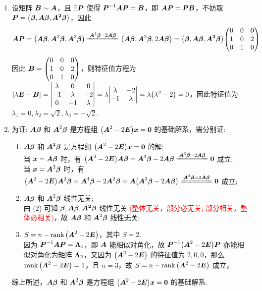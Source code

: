 \begin{solution}
\begin{enumerate}[label=(\arabic{*})]
        \item 设矩阵 $\vb*{B}\sim\vb*{A}$，且 $\exists\vb*{P}$ 使得 $\vb*{P}^{-1}\vb*{AP}=\vb*{B}$，即 $\vb*{AP}=\vb*{PB}$，不妨取 $\vb*{P}=\qty(\vb*{\beta},\vb*{A\beta},\vb*{A^2\beta})$，因此
              $$\vb*{AP}=\qty(\vb*{A\beta},\vb*{A}^2\vb*{\beta},\vb*{A}^3\vb*{\beta})\xlongequal{\vb*{A}^3\vb*{\beta}=2\vb*{A\beta}}\qty(\vb*{A\beta},\vb*{A}^2\vb*{\beta},2\vb*{A\beta})=\qty(\vb*{\beta},\vb*{A\beta},\vb*{A^2\beta})\mqty(0&0&0\\1&0&2\\0&1&0)$$
              因此 $\vb*{B}=\mqty(0&0&0\\1&0&2\\0&1&0)$，则特征值方程为 $|\lambda\vb*{E}-\vb*{B}|=\mqty|\lambda &0&0\\-1&\lambda&-2\\0&-1&\lambda|=\lambda\mqty|\lambda&-2\\-1&\lambda|=\lambda\qty(\lambda^2-2)=0$，因此特征值为 $\lambda_1=0,\lambda_2=\sqrt{2},\lambda_3=-\sqrt{2}$.
        \item 为证: $\vb*{A\beta}$ 和 $\vb*{A}^2\vb*{\beta}$ 是方程组 $\qty(\vb*{A}^2-2\vb*{E})\vb*{x}=\vb*{0}$ 的基础解系，需分别证:
              \begin{enumerate}[label=(\roman{*})]
                  \item $\vb*{A\beta}$ 和 $\vb*{A}^2\vb*{\beta}$ 是方程组 $\qty(\vb*{A}^2-2\vb*{E})\vb*{x}=\vb*{0}$ 的解;\\
                        当 $\vb*{x}=\vb*{A\beta}$ 时，有 $\qty(\vb*{A}^2-2\vb*{E})\vb*{A\beta}=\vb*{A}^3\vb*{\beta}-2\vb*{A\beta}\xlongequal{\vb*{A}^3\vb*{\beta}=2\vb*{A\beta}}\vb*{0}$ 成立;\\
                        当 $\vb*{x}=\vb*{A}^2\vb*{\beta}$ 时，有 $\qty(\vb*{A}^2-2\vb*{E})\vb*{A}^2\vb*{\beta}=\vb*{A}^4\vb*{\beta}-2\vb*{A}^2\vb*{\beta}=\vb*{A}\qty(\vb*{A}^3\vb*{\beta}-2\vb*{A\beta})\xlongequal{\vb*{A}^3\vb*{\beta}=2\vb*{A\beta}}\vb*{0}$ 成立;
                  \item $\vb*{A\beta}$ 和 $\vb*{A}^2\vb*{\beta}$ 线性无关;\\
                        由 (2) 可知 $\vb*{\beta},\vb*{A\beta},\vb*{A^2\beta}$ 线性无关 \textcolor{red}{(整体无关，部分必无关; 部分相关，整体必相关)}，故 $\vb*{A\beta}$ 和 $\vb*{A}^2\vb*{\beta}$ 线性无关;
                  \item $S=n-\rank\qty(\vb*{A}^2-2\vb*{E})$，其中 $S=2$.\\
                        因为 $\vb*{P}^{-1}\vb*{AP}=\vb*{\Lambda}_1$，即 $\vb*{A}$ 能相似对角化，故 $\vb*{P}^{-1}\qty(\vb*{A}^2-2\vb*{E})\vb*{P}$ 亦能相似对角化为矩阵 $\vb*{\Lambda}_2$，又因为 $\qty(\vb*{A}^2-2\vb*{E})$ 的特征值为 $2,0,0$，那么 $\rank\qty(\vb*{A}^2-2\vb*{E})=1$，且 $n=3$，故 $S=n-\rank\qty(\vb*{A}^2-2\vb*{E})$ 成立，
              \end{enumerate}
              综上所述，$\vb*{A\beta}$ 和 $\vb*{A}^2\vb*{\beta}$ 是方程组 $\qty(\vb*{A}^2-2\vb*{E})\vb*{x}=\vb*{0}$ 的基础解系.
    \end{enumerate}
\end{solution}

